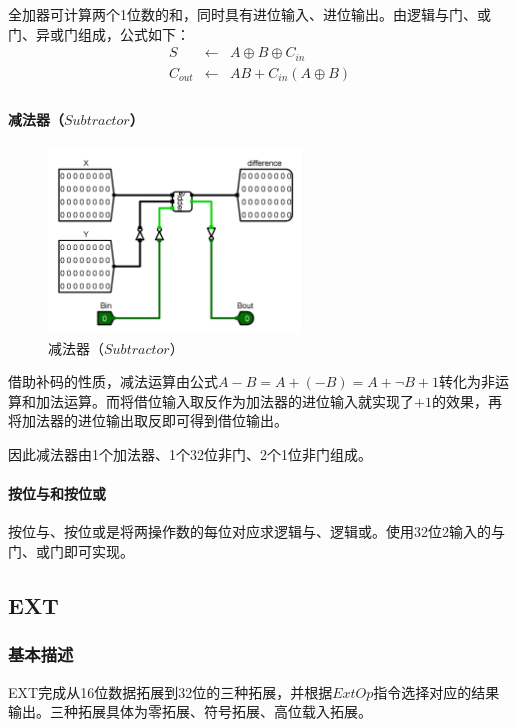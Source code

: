 \documentclass[main.tex]{subfiles}
\begin{document}
全加器可计算两个1位数的和，同时具有进位输入、进位输出。由逻辑与门、或门、异或门组成，公式如下：
$$
\begin{array}{rcl}
S &\leftarrow& A \oplus B \oplus C_{in} \\
C_{out} &\leftarrow& AB + C_{in}\left( A\oplus B\right) \\
\end{array}
$$

\paragraph{减法器（$Subtractor$）}

\begin{figure}[H]
\centering
\includegraphics[width=0.6\textwidth]{images/Substractor-circuit.png}
\caption{减法器（$Subtractor$）}
\end{figure}

借助补码的性质，减法运算由公式$A-B = A+(-B) = A+\neg B+1$转化为非运算和加法运算。而将借位输入取反作为加法器的进位输入就实现了$+1$的效果，再将加法器的进位输出取反即可得到借位输出。

因此减法器由1个加法器、1个32位非门、2个1位非门组成。

\paragraph{按位与和按位或}
按位与、按位或是将两操作数的每位对应求逻辑与、逻辑或。使用32位2输入的与门、或门即可实现。


\clearpage
\subsection{EXT}
\subsubsection{基本描述}
EXT完成从16位数据拓展到32位的三种拓展，并根据$ExtOp$指令选择对应的结果输出。三种拓展具体为零拓展、符号拓展、高位载入拓展。
\end{document}
